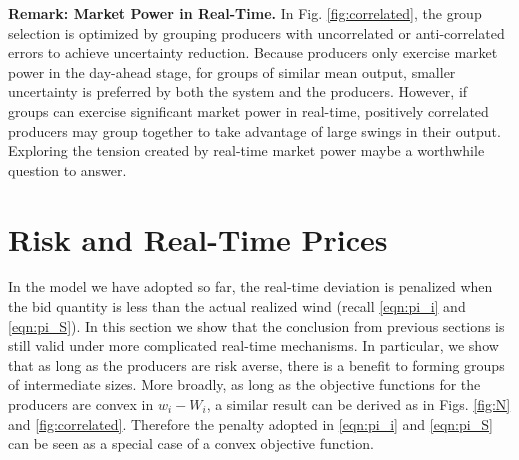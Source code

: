 \documentclass[journal]{IEEEtran}
\begin{document}
\textbf{Remark: Market Power in Real-Time.} In Fig. \ref{fig:correlated}, the group selection is optimized by grouping producers with uncorrelated or anti-correlated errors to achieve uncertainty reduction. Because producers only exercise market power in the day-ahead stage, for groups of similar mean output, smaller uncertainty is preferred by both the system and the producers. However, if groups can exercise significant market power in real-time, positively correlated producers may group together to take advantage of large swings in their output. Exploring the tension created by real-time market power maybe a worthwhile question to answer. 

\section{Risk and Real-Time Prices} \label{sec:real-time}
In the model we have adopted so far, the real-time deviation is penalized when the bid quantity is less than the actual realized wind (recall \eqref{eqn:pi_i} and \eqref{eqn:pi_S}). In this section we show that the conclusion from previous sections is still valid under more complicated real-time mechanisms. In particular, we show that as long as the producers are risk averse, there is a benefit to forming groups of intermediate sizes. More broadly, as long as the objective functions for the producers are convex in $w_i-W_i$, a similar result can be derived as in Figs. \ref{fig:N} and \ref{fig:correlated}. Therefore the penalty adopted in \eqref{eqn:pi_i} and \eqref{eqn:pi_S} can be seen as a special case of a convex objective function. 
\end{document}
